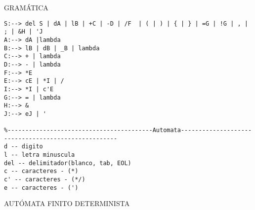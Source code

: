 \documentclass{article}
\begin{document}
\newpage
\begin{center}
    GRAMÁTICA
\end{center}
\begin{verbatim}
S:--> del S | dA | lB | +C | -D | /F  | ( | ) | { | } | =G | !G | , | ; | &H | 'J
A:--> dA |lambda
B:--> lB | dB | _B | lambda  
C:--> + | lambda
D:--> - | lambda
F:--> *E
E:--> cE | *I | /
I:--> *I | c'E
G:--> = | lambda
H:--> &
J:--> eJ | '

%-----------------------------------------Automata----------------------------------------------------
d -- digito
l -- letra minuscula
del -- delimitador(blanco, tab, EOL)
c -- caracteres - (*)
c' -- caracteres - (*/)
e -- caracteres - (')
\end{verbatim}
\newpage
\begin{center}
AUTÓMATA FINITO DETERMINISTA
\end{center}

\vspace*{1cm}
\end{document}
